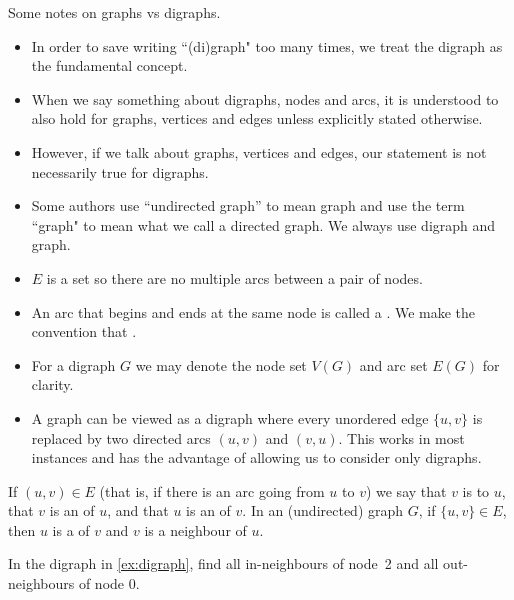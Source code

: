 Some notes on graphs vs digraphs.
\begin{itemize}
  \item In order to save writing ``(di)graph" too many times, we treat the digraph as the fundamental concept.
  \item When we say something about digraphs, nodes and arcs, it is understood to also hold for graphs, 
  vertices and edges unless explicitly stated otherwise. 
  \item However, if we talk about graphs, vertices and edges, our statement is not necessarily true for digraphs. 
  \item Some authors use ``undirected graph'' to mean graph and use the term ``graph" to mean what we call a directed graph. 
  We always use digraph and graph.
  \item $E$ is a set so there are no multiple arcs between a pair of nodes.
  \item An arc that begins and ends at the same node is called a . 
  We make the convention that . 
  \item For a digraph $G$ we may denote the node set $V(G)$ and arc set $E(G)$ for clarity.
  \item A graph can be viewed as a digraph where every unordered edge $\{u, v\}$ 
  is replaced by two directed arcs $(u, v)$ and $(v, u)$.  
  This works in most instances and has the advantage of allowing us to consider only digraphs.
\end{itemize}

\begin{Definition}\label{def:adjacent}  
If $(u, v)\in E$ (that is, if there is an arc going from $u$ to $v$) we say that $v$ is  
to $u$, that $v$ is an  of $u$, and that $u$ is an  of $v$.
In an (undirected) graph $G$, if $\{u, v\} \in E$, then $u$ is a  of $v$ and $v$ is a neighbour of $u$. 
\end{Definition}

\begin{Boxample}[2]
In the digraph in \cref{ex:digraph}, find all in-neighbours of node~2 and all out-neighbours of node 0.
\end{Boxample}

